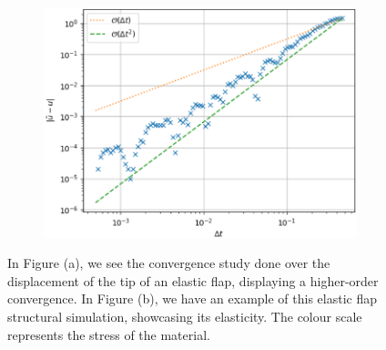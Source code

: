 \documentclass[
  english,        %
  font=times,     %
  onecolumn,      %
]{tumarticle}
\begin{document}
\begin{figure}[!ht]
    \centering
    \begin{subfigure}[b]{0.5\textwidth}
        \includegraphics[width=\textwidth]{resources/calculix_convergence_study.png}
        \caption{}
    \end{subfigure}
    \hspace{0.8cm}
    \begin{subfigure}[b]{0.35\textwidth}
        \caption{}
    \end{subfigure}
    \caption{In Figure (a), we see the convergence study done over the displacement of the tip of an elastic flap, displaying a higher-order convergence.
    In Figure (b), we have an example of this elastic flap structural simulation, showcasing its elasticity. The colour scale represents the stress of the material.}
    \label{fig:calculix_convergence}
\end{figure}
\end{document}
